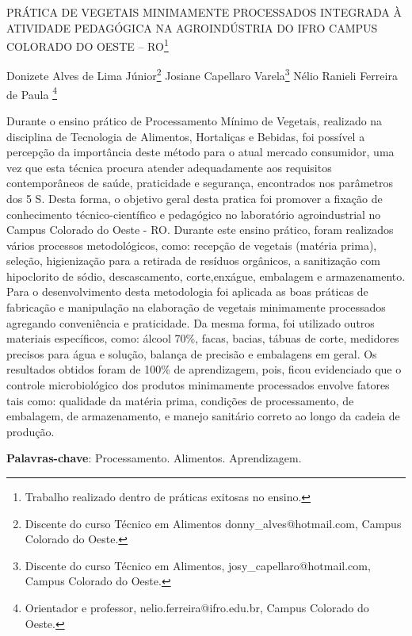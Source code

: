 \documentclass[article,12pt,onesidea,4paper,english,brazil]{abntex2}
\begin{document}
	
	
	\frenchspacing 
	
	\begin{center}
		\LARGE PRÁTICA DE VEGETAIS MINIMAMENTE PROCESSADOS INTEGRADA À ATIVIDADE PEDAGÓGICA NA AGROINDÚSTRIA DO IFRO CAMPUS COLORADO DO OESTE -- RO\footnote{Trabalho realizado dentro de práticas exitosas no ensino.}
		
		\normalsize
		Donizete Alves de Lima Júnior\footnote{Discente do curso Técnico em Alimentos donny\_alves@hotmail.com, Campus Colorado do Oeste.} 
		Josiane Capellaro Varela\footnote{Discente do curso Técnico em Alimentos, josy\_capellaro@hotmail.com, Campus Colorado do Oeste.} 
		Nélio Ranieli Ferreira de Paula \footnote{Orientador e professor, nelio.ferreira@ifro.edu.br, Campus Colorado do Oeste.} 
	\end{center}
	
	\noindent Durante o ensino prático de Processamento Mínimo de Vegetais, realizado na disciplina de Tecnologia de Alimentos, Hortaliças e Bebidas, foi possível a percepção da importância deste método para o atual mercado consumidor, uma vez que esta técnica procura atender adequadamente aos requisitos contemporâneos de saúde, praticidade e segurança, encontrados nos parâmetros dos 5 S. Desta forma, o objetivo geral desta pratica foi promover a fixação de conhecimento técnico-científico e pedagógico no laboratório agroindustrial no Campus Colorado do Oeste - RO. Durante este ensino prático, foram realizados vários processos metodológicos, como: recepção de vegetais (matéria prima), seleção, higienização para a retirada de resíduos orgânicos, a sanitização com hipoclorito de sódio, descascamento, corte,enxágue, embalagem e armazenamento. Para o desenvolvimento desta metodologia foi aplicada as boas práticas de fabricação e manipulação na elaboração de vegetais minimamente processados agregando conveniência e praticidade. Da mesma forma, foi utilizado outros materiais específicos, como: álcool 70\%, facas, bacias, tábuas de corte, medidores precisos para água e solução, balança de precisão e embalagens em geral.  Os resultados obtidos foram de 100\% de aprendizagem, pois, ficou evidenciado que o controle microbiológico dos produtos minimamente processados envolve fatores tais como: qualidade da matéria prima, condições de processamento, de embalagem, de armazenamento, e manejo sanitário correto ao longo da cadeia de produção.
	
	\vspace{\onelineskip}
	
	\noindent
	\textbf{Palavras-chave}: Processamento. Alimentos. Aprendizagem.
	
\end{document}
